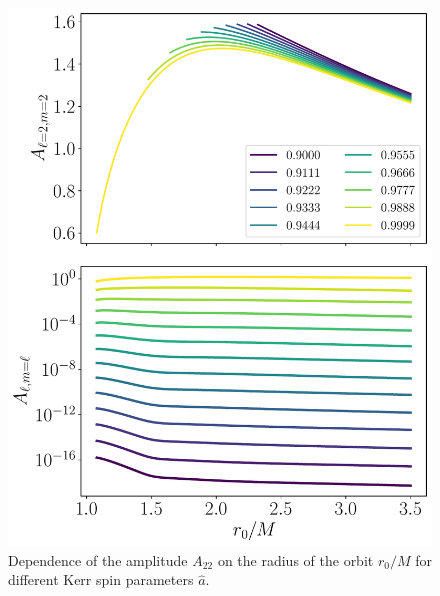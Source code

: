 \documentclass[%
 reprint,
 nofootinbib,
 amsmath,amssymb,
 aps,
 prd,
]{revtex4-2}
\begin{document}
\begin{figure}[!htp]
    \centering
    \includegraphics[width=0.98\linewidth]{figures/amp_combined.pdf}
    \caption{Dependence of the amplitude $A_{22}$ on the radius of the orbit $r_0/M$ for different Kerr spin parameters $\hat{a}$.}
    \label{fig:amplitudeVariation}
\end{figure}
\end{document}
